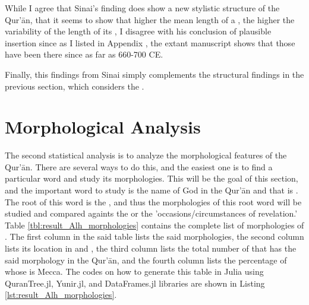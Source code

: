 While I agree that Sinai's finding does show a new stylistic structure of the Qur'\=an, that it seems to show that higher the mean   length of a  , the higher the variability of the length of its  , I disagree with his conclusion of plausible insertion since as I listed in Appendix , the extant manuscript shows that those   have been there since as far as 660-700 CE.

Finally, this findings from Sinai simply complements the structural findings in the previous section, which considers the  .

\section{Morphological Analysis}\label{sec:result_morphological_analysis}
The second statistical analysis is to analyze the morphological features of the Qur'\=an. There are several ways to do this, and the easiest one is to find a particular word and study its morphologies. This will be the goal of this section, and the important word to study is the name of God in the Qur'\=an and that is  . The root of this word is the  , and thus the morphologies of this root word will be studied and compared againts the   or the 'occasions/circumstances of revelation.' Table \ref{tbl:result_Alh_morphologies} contains the complete list of morphologies of  . The first column in the said table lists the said morphologies, the second column lists its location in   and  , the third column lists the total number of   that has the said morphology in the Qur'\=an, and the fourth column lists the percentage of   whose   is Mecca. The codes on how to generate this table in Julia using QuranTree.jl, Yunir.jl, and DataFrames.jl libraries are shown in Listing \ref{lst:result_Alh_morphologies}.

